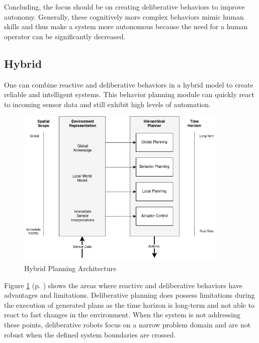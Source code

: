 Concluding, the focus should be on creating deliberative behaviors to improve autonomy. Generally, these cognitively more complex behaviors mimic human skills and thus make a system more autonomous because the need for a human operator can be significantly decreased.

%

\subsection{Hybrid}

One can combine reactive and deliberative behaviors in a hybrid model to create reliable and intelligent systems. This behavior planning module can quickly react to incoming sensor data and still exhibit high levels of automation. 

\begin{figure}[ht]
	\centering
	\includegraphics[width=0.9\textwidth]{images/Deliberative_hierarchical_planning.png} 
	\caption{Hybrid Planning Architecture \cite{arkin1998}}
	\label{fig:hybrid_planning}
\end{figure}

Figure \ref{fig:hybrid_planning} (p. \pageref{fig:hybrid_planning}) shows the areas where reactive and deliberative behaviors have advantages and limitations. Deliberative planning does possess limitations during the execution of generated plans as the time horizon is long-term and not able to react to fast changes in the environment. When the system is not addressing these points, deliberative robots focus on a narrow problem domain and are not robust when the defined system boundaries are crossed\cite{arkin1998}.

